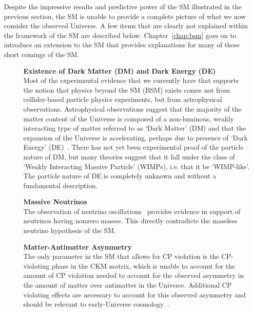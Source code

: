Despite the impressive results and predictive power of the SM illustrated in the previous
section, the SM is unable to provide a complete picture of what we now consider the observed
Universe.
A few items that are clearly not explained within the framework of the SM are described below.
Chapter~\ref{chap:bsm} goes on to introduce an extension to the SM that provides explanations
for many of these short comings of the SM.

\begin{description}
    \item[] \textbf{Existence of Dark Matter (DM) and Dark Energy (DE)} \\
        Most of the experimental evidence that we currently have that supports the notion that
        physics beyond the SM (BSM) exists comes not from collider-based particle physics experiments,
        but from astrophysical observations.
        Astrophysical observations suggest that the majority of the matter content of the Universe
        is composed of a non-luminous, weakly interacting type of matter referred to as `Dark Matter' (DM)
        and that the expansion of the Universe is accelerating, perhaps due to presence of
        `Dark Energy' (DE)~\cite{Davis:2014csa,PlanckCollab}.
        There has not yet been experimental proof of the particle nature of DM, but
        many theories suggest that it fall under the class of `Weakly Interacting Massive Particle' (WIMPs), i.e. that it be `WIMP-like'.
        The particle nature of DE is completely unknown and without a fundamental description.
    \item[] \textbf{Massive Neutrinos} \\ The observation of neutrino oscillations~\cite{Fukuda:1998mi} provides evidence
        in support of neutrinos having nonzero masses. This directly contradicts the massless neutrino hypothesis of the SM.
    \item[] \textbf{Matter-Antimatter Asymmetry} \\
        The only parameter in the SM that allows for CP violation is the CP-violating phase in the CKM matrix,
        which is unable to account for the amount of CP violation needed to account for the
        observed asymmetry in the amount of matter over antimatter in the Universe.
        Additional CP violating effects are necessary to account for this observed asymmetry and should be relevant
        to early-Universe cosmology~\cite{Sakharov_1991}.

\end{description}
